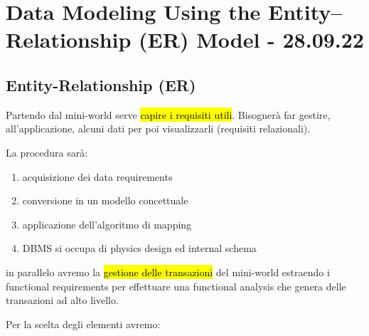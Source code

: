 \newpage
\section{Data Modeling Using the Entity–Relationship (ER) Model - 28.09.22}


\subsection{Entity-Relationship (ER)}

Partendo dal mini-world serve \hl{capire i requisiti utili}. Bisognerà far gestire, all'applicazione, alcuni dati per poi visualizzarli (requisiti relazionali).

La procedura sarà:

\begin{enumerate}
	\item acquisizione dei data requirements
	\item conversione in un modello concettuale
	\item applicazione dell'algoritmo di mapping
	\item DBMS si occupa di physics design ed internal schema
\end{enumerate}

in parallelo avremo la \hl{gestione delle transazioni} del mini-world estraendo i functional requirements per effettuare una functional analysis che genera delle transazioni ad alto livello.


Per la scelta degli elementi avremo:

